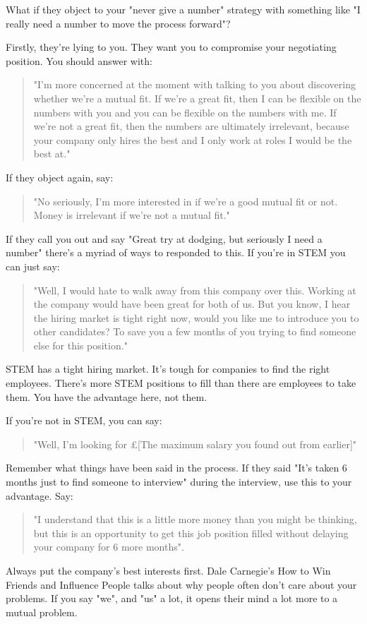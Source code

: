 \documentclass{article}
\begin{document}
What if they object to your "never give a number" strategy with
something like "I really need a number to move the process forward"?

Firstly, they're lying to you. They want you to compromise your
negotiating position. You should answer with:
\begin{quote}
    "I'm more concerned at the moment with talking to you about discovering
whether we're a mutual fit. If we're a great fit, then I can be flexible
on the numbers with you and you can be flexible on the numbers with me.
If we're not a great fit, then the numbers are ultimately irrelevant,
because your company only hires the best and I only work at roles I
would be the best at."
\end{quote}
If they object again, say:
\begin{quote}
"No seriously, I'm more interested in if we're a good mutual fit or
not. Money is irrelevant if we're not a mutual fit."
\end{quote}
If they call you out and say "Great try at dodging, but seriously I
need a number" there's a myriad of ways to responded to this. If you're
in STEM you can just say:
\begin{quote}
    "Well, I would hate to walk away from this company over this. Working
at the company would have been great for both of us. But you know, I
hear the hiring market is tight right now, would you like me to
introduce you to other candidates? To save you a few months of you
trying to find someone else for this position."
\end{quote}
STEM has a tight hiring market. It's tough for companies to find the
right employees. There's more STEM positions to fill than there are
employees to take them. You have the advantage here, not them.

If you're not in STEM, you can say:
\begin{quote}
"Well, I'm looking for £[The maximum salary you found out from
earlier]"
\end{quote}
Remember what things have been said in the process. If they said "It's
taken 6 months just to find someone to interview" during the interview,
use this to your advantage. Say:
\begin{quote}
    "I understand that this is a little more money than you might be
thinking, but this is an opportunity to get this job position filled
without delaying your company for 6 more months".
\end{quote}
Always put the company's best interests first. Dale Carnegie's How to
Win Friends and Influence People talks about why people often don't care
about your problems. If you say "we", and "us" a lot, it opens their
mind a lot more to a mutual problem.
\end{document}
